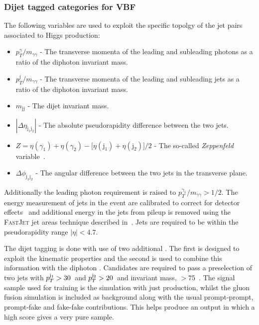 \subsubsection{Dijet tagged categories for VBF}
\label{sec:vbf_tag}

The following variables are used to exploit the specific topolgy of the jet pairs associated to \VBF Higgs production:

\begin{itemize}
  \item $p_{T}^{\gamma}/m_{\gamma\gamma}$ - The transverse momenta of the leading and subleading photons as a ratio of the diphoton invariant mass.
  \item $p_{T}^{\mathrm{j}}/m_{\gamma\gamma}$ - The transverse momenta of the leading and subleading jets as a ratio of the diphoton invariant mass.
  \item $m_{\mathrm{jj}}$ - The dijet invariant mass.
  \item $|\Delta\eta_{\mathrm{j}_{1}\mathrm{j}_{2}}|$ - The absolute pseudorapidity difference between the two jets.
  \item $Z = \eta(\gamma_{1})+\eta(\gamma_{2}) - \bigl[\eta(\mathrm{j}_{1})+\eta(\mathrm{j}_{2})\bigr]/2$ - The so-called \emph{Zeppenfeld} variable~\cite{Zeppenfeld}.
  \item $\Delta\phi_{\mathrm{j}_{1}\mathrm{j}_{2}}$ - The angular difference between the two jets in the transverse plane.
\end{itemize}

Additionally the leading photon \pT requirement is raised to $p_{T}^{\gamma_{1}}/m_{\gamma\gamma}>1/2$. The energy measurement of jets in the event are calibrated to correct for detector effects~\cite{jet_energy_corrections} and additional energy in the jets from pileup is removed using the \textsc{FastJet} jet areas technique described in~\cite{pu_jets1,pu_jets2,pu_jets3}. Jets are required to be within the pseudorapidity range $|\eta|<4.7$.

The dijet tagging is done with use of two additional \MVAs. The first is designed to exploit the \VBF kinematic properties and the second is used to combine this information with the diphoton \BDT. Candidates are required to pass a \VBF preselection of two jets with $p_{T}^{\mathrm{j}_{1}}>30$~\GeV and $p_{T}^{\mathrm{j}_{2}}>20$~\GeV and invariant mass, \mjj$>75$~\GeV. The signal sample used for training is the \SM \MC simulation with just \VBF production, whilst the \SM gluon fusion \MC simulation is included as background along with the usual prompt-prompt, prompt-fake and fake-fake contributions. This helps produce an output in which a high score gives a very pure \VBF sample.

